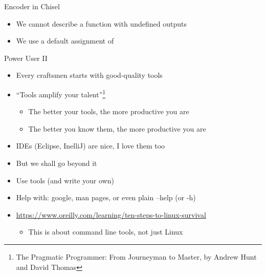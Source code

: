 \begin{frame}[fragile]{Encoder in Chisel}
\begin{itemize}
\item We cannot describe a function with undefined outputs
\item We use a default assignment of 
\end{itemize}
\end{frame}


\begin{frame}[fragile]{Power User II}
\begin{itemize}
\item Every craftsmen starts with good-quality tools
\item ``Tools amplify your talent''\footnote{The Pragmatic Programmer: From Journeyman to Master, by Andrew Hunt and David Thomas}
\begin{itemize}
\item The better your tools, the more productive you are
\item The better you know them, the more productive you are
\end{itemize}
\item IDEs (Eclipse, InelliJ) are nice, I love them too
\item But we shall go beyond it
\item Use tools (and write your own)
\item Help with: google, man pages, or even plain --help (or -h)
\item \url{https://www.oreilly.com/learning/ten-steps-to-linux-survival}
\begin{itemize}
\item This is about command line tools, not just Linux
\end{itemize}
\end{itemize}
\end{frame}

